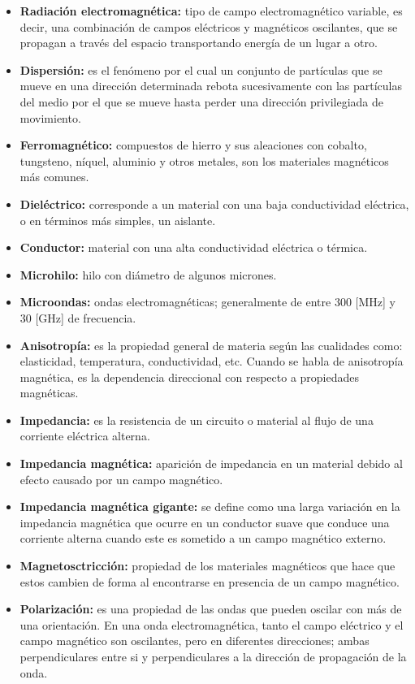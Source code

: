 \documentclass[12pt,letterpaper]{article}
\numberwithin{equation}{section}
\begin{document}
\begin{itemize}
	\item \textbf{Radiación electromagnética:} tipo de campo electromagnético variable, es decir, una combinación de campos eléctricos y magnéticos oscilantes, que se propagan a través del espacio transportando energía de un lugar a otro.
	\item \textbf{Dispersión:} es el fenómeno por el cual un conjunto de partículas que se mueve en una dirección determinada rebota sucesivamente con las partículas del medio por el que se mueve hasta perder una dirección privilegiada de movimiento. 
	\item \textbf{Ferromagnético:} compuestos de hierro y sus aleaciones con cobalto, tungsteno, níquel, aluminio y otros metales, son los materiales magnéticos más comunes.
	\item \textbf{Dieléctrico:} corresponde a un material con una baja conductividad eléctrica, o en términos más simples, un aislante.
	\item \textbf{Conductor:} material con una alta conductividad eléctrica o térmica.
	\item \textbf{Microhilo:} hilo con diámetro de algunos micrones.
	\item \textbf{Microondas:} ondas electromagnéticas; generalmente de entre 300 [MHz] y 30 [GHz] de frecuencia.
	\item \textbf{Anisotropía:} es la propiedad general de materia según las cualidades como: elasticidad, temperatura, conductividad, etc. Cuando se habla de anisotropía magnética, es la dependencia direccional con respecto a propiedades magnéticas.
	\item \textbf{Impedancia:} es la resistencia de un circuito o material al flujo de una corriente eléctrica alterna.
	\item \textbf{Impedancia magnética:} aparición de impedancia en un material debido al efecto causado por un campo magnético.
	\item \textbf{Impedancia magnética gigante:} se define como una larga variación en la impedancia magnética que ocurre en un conductor suave que conduce una corriente alterna cuando este es sometido a un campo magnético externo.
	\item \textbf{Magnetosctricción:} propiedad de los materiales magnéticos que hace que estos cambien de forma al encontrarse en presencia de un campo magnético.
	\item \textbf{Polarización:} es una propiedad de las ondas que pueden oscilar con más de una orientación. En una onda electromagnética, tanto el campo eléctrico y el campo magnético son oscilantes, pero en diferentes direcciones; ambas perpendiculares entre si y perpendiculares a la dirección de propagación de la onda.

\end{itemize}
\end{document}
